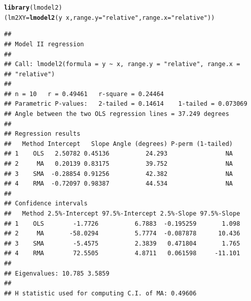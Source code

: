 \documentclass[10pt,a4paper]{article}\usepackage[]{graphicx}\usepackage[]{color}
\makeatletter
\newcommand{\hlstr}[1]{\textcolor[rgb]{0.192,0.494,0.8}{#1}}%
\newcommand{\hlopt}[1]{\textcolor[rgb]{0,0,0}{#1}}%
\newcommand{\hlstd}[1]{\textcolor[rgb]{0.345,0.345,0.345}{#1}}%
\newcommand{\hlkwb}[1]{\textcolor[rgb]{0.69,0.353,0.396}{#1}}%
\newcommand{\hlkwc}[1]{\textcolor[rgb]{0.333,0.667,0.333}{#1}}%
\newcommand{\hlkwd}[1]{\textcolor[rgb]{0.737,0.353,0.396}{\textbf{#1}}}%
\newenvironment{kframe}{%
 \def\at@end@of@kframe{}%
 \ifinner\ifhmode%
  \def\at@end@of@kframe{\end{minipage}}%
  \begin{minipage}{\columnwidth}%
 \fi\fi%
 \def\FrameCommand##1{\hskip\@totalleftmargin \hskip-\fboxsep
 \colorbox{shadecolor}{##1}\hskip-\fboxsep
     \hskip-\linewidth \hskip-\@totalleftmargin \hskip\columnwidth}%
 \MakeFramed {\advance\hsize-\width
   \@totalleftmargin\z@ \linewidth\hsize
   \@setminipage}}%
 {\par\unskip\endMakeFramed%
 \at@end@of@kframe}
\newenvironment{knitrout}{}{} %
\makeatother
\begin{document}
\begin{knitrout}
\color{fgcolor}\begin{kframe}
\begin{alltt}
\hlkwd{library}\hlstd{(lmodel2)}
\hlstd{(lm2XY} \hlkwb{=} \hlkwd{lmodel2}\hlstd{(y}\hlopt{~}\hlstd{x,}\hlkwc{range.y}\hlstd{=}\hlstr{"relative"}\hlstd{,} \hlkwc{range.x}\hlstd{=}\hlstr{"relative"} \hlstd{))}
\end{alltt}


{\ttfamily\noindent\itshape\color{messagecolor}{\#\# No permutation test will be performed}}\begin{verbatim}
## 
## Model II regression
## 
## Call: lmodel2(formula = y ~ x, range.y = "relative", range.x =
## "relative")
## 
## n = 10   r = 0.49461   r-square = 0.24464 
## Parametric P-values:   2-tailed = 0.14614    1-tailed = 0.073069 
## Angle between the two OLS regression lines = 37.249 degrees
## 
## Regression results
##   Method Intercept   Slope Angle (degrees) P-perm (1-tailed)
## 1    OLS   2.50782 0.45136          24.293                NA
## 2     MA   0.20139 0.83175          39.752                NA
## 3    SMA  -0.28854 0.91256          42.382                NA
## 4    RMA  -0.72097 0.98387          44.534                NA
## 
## Confidence intervals
##   Method 2.5%-Intercept 97.5%-Intercept 2.5%-Slope 97.5%-Slope
## 1    OLS        -1.7726          6.7883  -0.195259       1.098
## 2     MA       -58.0294          5.7774  -0.087878      10.436
## 3    SMA        -5.4575          2.3839   0.471804       1.765
## 4    RMA        72.5505          4.8711   0.061598     -11.101
## 
## Eigenvalues: 10.785 3.5859 
## 
## H statistic used for computing C.I. of MA: 0.49606
\end{verbatim}
\end{kframe}
\end{knitrout}
\end{document}
